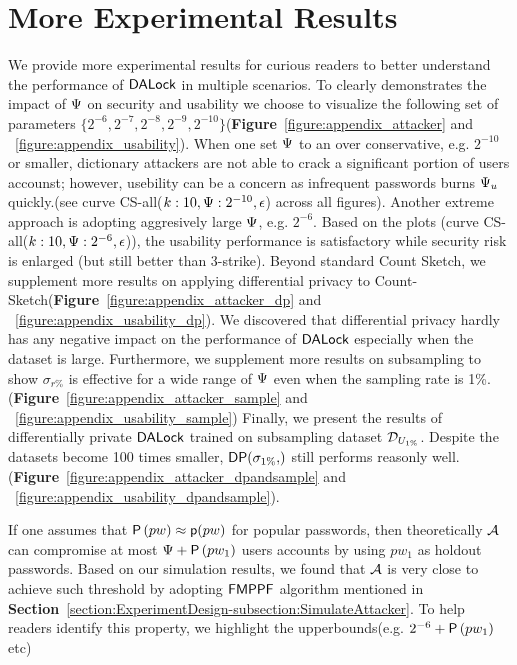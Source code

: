 \section{More Experimental Results}\label{appendix:experimentalResults}
We provide more experimental results for curious readers to better understand the performance of $\mathsf{DALock}$ in multiple scenarios. To clearly demonstrates the impact of $\Psi$ on security and usability we choose to visualize the following set of parameters $\{2^{-6}, 2^{-7},2^{-8},2^{-9}, 2^{-10}\}$(\textbf{Figure}~\ref{figure:appendix_attacker} and ~\ref{figure:appendix_usability}). When one set $\Psi$ to an over conservative, e.g. $2^{-10}$ or smaller, dictionary attackers are not able to crack a significant portion of users accounst; however, usebility can be a concern as infrequent passwords burns $\Psi_{u}$ quickly.(see curve CS-all($k:10,\Psi:2^{-10},\epsilon$) across all figures). Another extreme approach is adopting aggresively large $\Psi$, e.g. $2^{-6}$. Based on the plots (curve CS-all($k:10,\Psi:2^{-6},\epsilon$)), the usability performance is satisfactory while security risk is enlarged (but still better than 3-strike). Beyond standard Count Sketch, we supplement more results on applying differential privacy to Count-Sketch(\textbf{Figure}~\ref{figure:appendix_attacker_dp} and  ~\ref{figure:appendix_usability_dp}). We discovered that differential privacy hardly has any negative impact on the performance of $\mathsf{DALock}$ especially when the dataset is large. Furthermore, we supplement more results on subsampling to show $\sigma_{r\%}$ is effective for a wide range of $\Psi$ even when the sampling rate is 1\%.(\textbf{Figure}~\ref{figure:appendix_attacker_sample} and  ~\ref{figure:appendix_usability_sample}) Finally, we present the results of differentially private $\mathsf{DALock}$ trained on subsampling dataset $\mathcal{D}_{{U_{1\%}}}$. Despite the datasets become 100 times smaller, $\DP{\sigma_{1\%}}$ still performs reasonly well.(\textbf{Figure}~\ref{figure:appendix_attacker_dpandsample} and ~\ref{figure:appendix_usability_dpandsample}).

  If one assumes that $\mathsf{P}\left(pw\right) \approx \textsf{p}(pw)$ for popular passwords, then theoretically $\mathcal{A}$ can compromise at most $\Psi + \mathsf{P}\left(pw_1\right)$ users accounts by using $pw_1$ as holdout passwords. Based on our simulation results, we found that $\mathcal{A}$ is very close to achieve such threshold by adopting $\mathsf{FMPPF}$ algorithm mentioned in \textbf{Section}~\ref{section:ExperimentDesign-subsection:SimulateAttacker}. To help readers identify this property, we highlight the upperbounds(e.g. $2^{-6} + \mathsf{P}\left(pw_1\right)$ etc)

